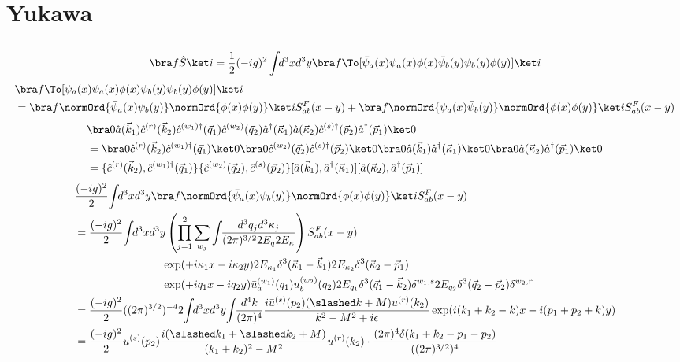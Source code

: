 \documentclass[
  ngerman,		%
  a4paper,		%
  11pt,			%
  DIV=12,		%
  parskip=half  	%
]{scrartcl}
\begin{document}
\section{Yukawa}
\subsection{}
\[\bra f \hat S \ket i = \frac 1 2(-ig)^2\int\!\!d^3xd^3y \bra f \To[\bar\psi_a(x)\psi_a(x)\phi(x)\bar\psi_b(y)\psi_b(y)\phi(y)] \ket i\]
\begin{align*}
&\bra f \To[\bar\psi_a(x)\psi_a(x)\phi(x)\bar\psi_b(y)\psi_b(y)\phi(y)] \ket i\\
 &= \bra f \normOrd{\bar\psi_a(x)\psi_b(y)}\normOrd{\phi(x)\phi(y)} \ket i S^F_{ab}(x-y) +
	\bra f \normOrd{\psi_a(x)\bar\psi_b(y)}\normOrd{\phi(x)\phi(y)} \ket i S^F_{ab}(x-y)
\end{align*}
\begin{align*}
&\bra 0 \hat a(\vec k_1)\hat c^{(r)}(\vec k_2)\hat c^{(w_1)\dag}(\vec q_1)\hat c^{(w_2)}(\vec q_2)\hat a^\dag(\vec \kappa_1)\hat a(\vec \kappa_2) \hat c^{(s)\dag}(\vec p_2)\hat a^\dag(\vec p_1)\ket 0\\
&= \bra 0 \hat c^{(r)}(\vec k_2)\hat c^{(w_1)\dag}(\vec q_1)\ket 0 \bra 0\hat c^{(w_2)}(\vec q_2) \hat c^{(s)\dag}(\vec p_2)\ket 0 \bra 0 \hat a(\vec k_1)\hat a^\dag(\vec \kappa_1)\ket 0 \bra 0\hat a(\vec \kappa_2)\hat a^\dag(\vec p_1)\ket 0\\
 &= \{\hat c^{(r)}(\vec k_2),\hat c^{(w_1)\dag}(\vec q_1)\} \{\hat c^{(w_2)}(\vec q_2),\hat c^{(s)}(\vec p_2)\} [\hat a(\vec k_1),\hat a^\dag(\vec \kappa_1)] [\hat a(\vec \kappa_2),\hat a^\dag(\vec p_1)]
\end{align*}
\begin{align*}
& \frac {(-ig)^2} 2\!\int\!\!d^3xd^3y \bra f\normOrd{\bar\psi_a(x)\psi_b(y)}\normOrd{\phi(x)\phi(y)} \ket i S^F_{ab}(x-y)\\
 &= \frac {(-ig)^2} 2\!\int\!\!d^3xd^3y \left( \prod\limits_{j=1}^2 \sum\limits_{w_j}\int\!\!\frac {d^3q_jd^3\kappa_j}{(2\pi)^{3/2}2E_q2E_\kappa} \right) S^F_{ab}(x-y)\\
&\hspace{80pt} \exp(+i\kappa_1x - i\kappa_2y)2E_{\kappa_1}\delta^3(\vec \kappa_1 - \vec k_1)2E_{\kappa_2}\delta^3(\vec \kappa_2 - \vec p_1)\\
&\hspace{80pt} \exp(+iq_1x - iq_2y) \bar u^{(w_1)}_a(q_1) u^{(w_2)}_b(q_2)2E_{q_1}\delta^3(\vec q_1 - \vec k_2)\delta^{w_1,s}2E_{q_2}\delta^3(\vec q_2 - \vec p_2)\delta^{w_2,r}\\
 &= \frac {(-ig)^2} 2 ((2\pi)^{3/2})^{-4} 2\!\int\!\!d^3xd^3y \!\int\!\! \frac {d^4k}{(2\pi)^4}\frac {i\bar u^{(s)}(p_2)(\slashed k + M)u^{(r)}(k_2)}{k^2 - M^2 + i\epsilon}\exp(i(k_1 + k_2 - k)x - i(p_1 + p_2 + k)y)\\
 &=\frac {(-ig)^2} 2 \bar u^{(s)}(p_2)\frac {i(\slashed k_1 + \slashed k_2 + M)}{(k_1+k_2)^2 - M^2}u^{(r)}(k_2) \cdot \frac {(2\pi)^4\delta(k_1 + k_2 - p_1- p_2)}{((2\pi)^{3/2})^{4}}
\end{align*}
\end{document}
